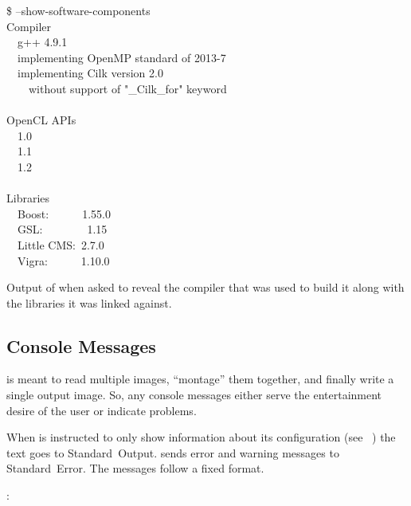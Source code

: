 \begin{exemplar}[htbp]
  \centering
  \begin{terminal}
    \$ \app{} --show-software-components \\
    Compiler \\
    ~~g++ 4.9.1 \\
    ~~implementing OpenMP standard of 2013-7 \\
    ~~implementing Cilk version 2.0 \\
    ~~~~without support of "\_Cilk\_for" keyword \\
    ~ \\
    OpenCL APIs \\
    ~~1.0 \\
    ~~1.1 \\
    ~~1.2  \\
    ~ \\
    Libraries \\
    ~~Boost:~~~~~~1.55.0 \\
    ~~GSL:~~~~~~~~1.15 \\
    ~~Little CMS:~2.7.0 \\
    ~~Vigra:~~~~~~1.10.0
  \end{terminal}

  \caption[Output of ]{\label{ex:show-software-components}Output of \appcmd{} when
    asked to reveal the compiler that was used to build it along with the libraries it was
    linked against.}
\end{exemplar}


\subsection[Console Messages]{\label{sec:console-messages}%
  Console Messages}

\App{} is meant to read multiple images, ``montage'' them together, and finally write a single
output image.  So, any console messages either serve the entertainment desire of the user or
indicate problems.

When \appcmd{} is instructed to only show information about its configuration (see
\sectionName~) the text goes to Standard~Output.  \appcmd{}
sends error and warning messages to Standard~Error.  The messages
follow a fixed format.

\begin{literal}
  \app:  
\end{literal}

